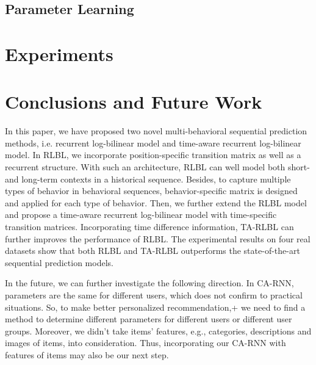 \documentclass{sig-alternate}
\begin{document}
\subsection{Parameter Learning}

\section{Experiments}

\section{Conclusions and Future Work}

In this paper, we have proposed two novel multi-behavioral sequential prediction methods, i.e. recurrent log-bilinear model and time-aware recurrent log-bilinear model. In RLBL, we incorporate position-specific transition matrix as well as a recurrent structure. With such an architecture, RLBL can well model both short- and long-term contexts in a historical sequence. Besides, to capture multiple types of behavior in behavioral sequences, behavior-specific matrix is designed and applied for each type of behavior. Then, we further extend the RLBL model and propose a time-aware recurrent log-bilinear model with time-specific transition matrices. Incorporating time difference information, TA-RLBL can further improves the performance of RLBL. The experimental results on four real datasets show that both RLBL and TA-RLBL outperforms the state-of-the-art sequential prediction models.

In the future, we can further investigate the following direction. In CA-RNN, parameters are the same for different users, which does not confirm to practical situations. So, to make better personalized recommendation,+ we need to find a method to determine different parameters for different users or different user groups. Moreover, we didn't take items' features, e.g., categories, descriptions and images of items, into consideration. Thus, incorporating our CA-RNN with features of items may also be our next step.

\small


\vspace{2cm}

\balancecolumns
\end{document}
